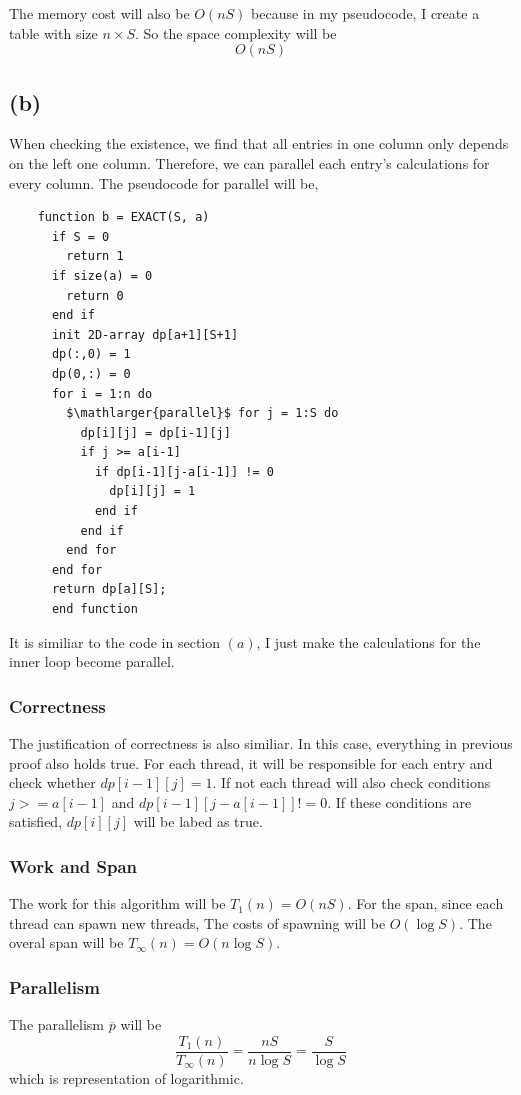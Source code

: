 \documentclass{article}
\begin{document}
The memory cost will also be $O(nS)$ because in my pseudocode, I create a table with size  $n \times S$. So the 
space complexity will be 
$$O(nS)$$


\subsection*{(b)}
When checking the existence, we find that all entries in one column only depends on the left one column.
Therefore, we can parallel each entry's calculations for every column.
The pseudocode for parallel will be,
\begin{multicols}{2}
  \begin{lstlisting}
    function b = EXACT(S, a)
      if S = 0 
        return 1
      if size(a) = 0
        return 0
      end if
      init 2D-array dp[a+1][S+1]
      dp(:,0) = 1
      dp(0,:) = 0
      for i = 1:n do
        $\mathlarger{parallel}$ for j = 1:S do
          dp[i][j] = dp[i-1][j]
          if j >= a[i-1]
            if dp[i-1][j-a[i-1]] != 0
              dp[i][j] = 1
            end if
          end if
        end for
      end for
      return dp[a][S];
      end function
  \end{lstlisting}
  \end{multicols}
  It is similiar to the code in section $(a)$, I just make the calculations for the inner loop become parallel.
  \subsubsection*{Correctness}
  
  The justification of correctness is also similiar. In this case, everything in previous proof also holds true.
  For each thread, it will be responsible for each entry and check whether $dp[i-1][j] = 1$. If not
  each thread will also check conditions $j >= a[i-1]$ and $dp[i-1][j-a[i-1]] != 0$. If these conditions are satisfied,
  $dp[i][j]$ will be labed as true.

  \subsubsection*{Work and Span}

  The work for this algorithm will be $T_1(n) = O(nS)$. For the span, since each thread can spawn new threads,
  The costs of spawning will be $O(\log S)$. The overal span will be $T_{\infty}(n) = O(n\log S)$.

  \subsubsection*{Parallelism}
  The parallelism $\overline{p}$ will be $$\frac{T_1(n)}{T_{\infty}(n)} = \frac{nS}{n\log S} =\frac{S}{\log S} $$
  which is representation of logarithmic. 
\end{document}
